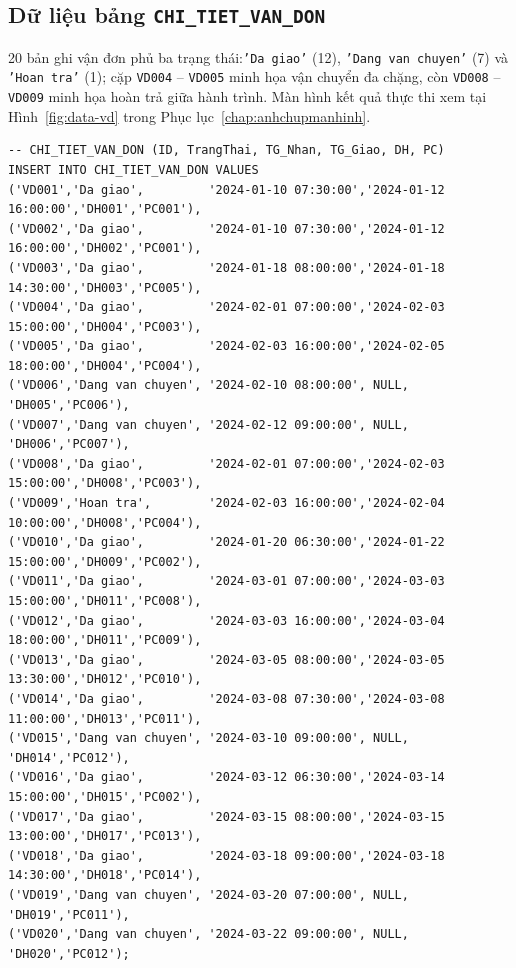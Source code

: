 \documentclass[11pt]{report}
\begin{document}

\subsection{Dữ liệu bảng \texttt{CHI\_TIET\_VAN\_DON}}

20 bản ghi vận đơn phủ ba trạng thái:\texttt{'Da giao'} (12), \texttt{'Dang van chuyen'} (7) và \texttt{'Hoan tra'} (1); cặp \texttt{VD004} -- \texttt{VD005} minh họa vận chuyển đa chặng, còn \texttt{VD008} -- \texttt{VD009} minh họa hoàn trả giữa hành trình. Màn hình kết quả thực thi xem tại Hình~\ref{fig:data-vd} trong Phục lục~\ref{chap:anhchupmanhinh}.

\begin{verbatim}
-- CHI_TIET_VAN_DON (ID, TrangThai, TG_Nhan, TG_Giao, DH, PC)
INSERT INTO CHI_TIET_VAN_DON VALUES
('VD001','Da giao',         '2024-01-10 07:30:00','2024-01-12 16:00:00','DH001','PC001'),
('VD002','Da giao',         '2024-01-10 07:30:00','2024-01-12 16:00:00','DH002','PC001'),
('VD003','Da giao',         '2024-01-18 08:00:00','2024-01-18 14:30:00','DH003','PC005'),
('VD004','Da giao',         '2024-02-01 07:00:00','2024-02-03 15:00:00','DH004','PC003'),
('VD005','Da giao',         '2024-02-03 16:00:00','2024-02-05 18:00:00','DH004','PC004'),
('VD006','Dang van chuyen', '2024-02-10 08:00:00', NULL,                'DH005','PC006'),
('VD007','Dang van chuyen', '2024-02-12 09:00:00', NULL,                'DH006','PC007'),
('VD008','Da giao',         '2024-02-01 07:00:00','2024-02-03 15:00:00','DH008','PC003'),
('VD009','Hoan tra',        '2024-02-03 16:00:00','2024-02-04 10:00:00','DH008','PC004'),
('VD010','Da giao',         '2024-01-20 06:30:00','2024-01-22 15:00:00','DH009','PC002'),
('VD011','Da giao',         '2024-03-01 07:00:00','2024-03-03 15:00:00','DH011','PC008'),
('VD012','Da giao',         '2024-03-03 16:00:00','2024-03-04 18:00:00','DH011','PC009'),
('VD013','Da giao',         '2024-03-05 08:00:00','2024-03-05 13:30:00','DH012','PC010'),
('VD014','Da giao',         '2024-03-08 07:30:00','2024-03-08 11:00:00','DH013','PC011'),
('VD015','Dang van chuyen', '2024-03-10 09:00:00', NULL,                'DH014','PC012'),
('VD016','Da giao',         '2024-03-12 06:30:00','2024-03-14 15:00:00','DH015','PC002'),
('VD017','Da giao',         '2024-03-15 08:00:00','2024-03-15 13:00:00','DH017','PC013'),
('VD018','Da giao',         '2024-03-18 09:00:00','2024-03-18 14:30:00','DH018','PC014'),
('VD019','Dang van chuyen', '2024-03-20 07:00:00', NULL,                'DH019','PC011'),
('VD020','Dang van chuyen', '2024-03-22 09:00:00', NULL,                'DH020','PC012');
\end{verbatim}
\end{document}
